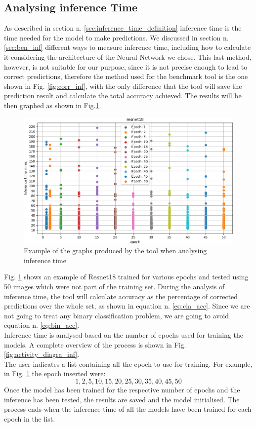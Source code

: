 \subsection{Analysing inference Time}
As described in section n. \ref{sec:inference_time_definition} inference time is the time needed for the model to make predictions. We discussed in section n. \ref{sec:ben_inf} different ways to measure inference time, including how to calculate it considering the architecture of the Neural Network we chose. This last method, however, is not suitable for our purpose, since it is not precise enough to lead to correct predictions, therefore the method used for the benchmark tool is the one shown in Fig. \ref{fig:corr_inf}, with the only difference that the tool will save the prediction result and calculate the total accuracy achieved. The results will be then graphed as shown in Fig.\ref{fig:infere_graph}. 
\begin{figure}[h]
\centering
	    \includegraphics[width = \gw cm]{img/epoch_inferencetime.png}
        \caption{Example of the graphs produced by the tool when analysing inference time}
        \label{fig:infere_graph}
\end{figure}

Fig. \ref{fig:infere_graph} shows an example of Resnet18 trained for various epochs and tested using 50 images which were not part of the training set. 
During the analysis of inference time, the tool will calculate accuracy as the percentage of corrected predictions over the whole set, as shown in equation n. \ref{eq:cla_acc}. Since we are not going to treat any binary classification problem, we are going to avoid equation n. \ref{eq:bin_acc}. \\
Inference time is analysed based on the number of epochs used for training the models. A complete overview of the process is shown in Fig. \ref{fig:activity_diagra_inf}.\\
The user indicates a list containing all the epoch to use for training. For example, in Fig. \ref{fig:infere_graph} the epoch inserted were:
\[
1,2,5,10,15,20,25,30,35,40,45,50
\]
Once the model has been trained for the respective number of epochs and the inference has been tested, the results are saved and the model initialised. The process ends when the inference time of all the models have been trained for each epoch in the list. \\

